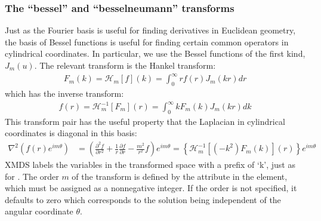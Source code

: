 \documentclass[letterpaper,10pt,english]{sphinxmanual}
\begin{document}
\ignorespaces 

\subsubsection{The “bessel” and “bessel\sphinxhyphen{}neumann” transforms}
\label{\detokenize{reference_elements:the-bessel-and-bessel-neumann-transforms}}\label{\detokenize{reference_elements:besseltransform}}\label{\detokenize{reference_elements:index-39}}
\sphinxAtStartPar
Just as the Fourier basis is useful for finding derivatives in Euclidean geometry, the basis of Bessel functions is useful for finding certain common operators in cylindrical co\sphinxhyphen{}ordinates.  In particular, we use the Bessel functions of the first kind, \(J_m(u)\).  The relevant transform is the Hankel transform:
\begin{equation*}
\begin{split}F_m(k) = \mathcal{H}_m \left[f\right](k) = \int_0^\infty r f(r) J_m(k r) dr\end{split}
\end{equation*}
\sphinxAtStartPar
which has the inverse transform:
\begin{equation*}
\begin{split}f(r) = \mathcal{H}^{-1}_m \left[F_m\right](r) = \int_0^\infty k F_m(k) J_m(k r) dk\end{split}
\end{equation*}
\sphinxAtStartPar
This transform pair has the useful property that the Laplacian in cylindrical co\sphinxhyphen{}ordinates is diagonal in this basis:
\begin{equation*}
\begin{split}\nabla^2 \left(f(r) e^{i m \theta}\right) &= \left(\frac{\partial^2 f}{\partial r^2} +\frac{1}{r}\frac{\partial f}{\partial r} -\frac{m^2}{r^2} f \right) e^{i m \theta} = \left\{\mathcal{H}^{-1}_m \left[(-k^2) F_m(k)\right](r) \right\} e^{i m \theta}\end{split}
\end{equation*}
\sphinxAtStartPar
XMDS labels the variables in the transformed space with a prefix of ‘k’, just as for {\hyperref[\detokenize{reference_elements:dft-transform}]{}}.  The order \(m\) of the transform is defined by the  attribute in the  element, which must be assigned as a non\sphinxhyphen{}negative integer.  If the order is not specified, it defaults to zero which corresponds to the solution being independent of the angular coordinate \(\theta\).
\end{document}
